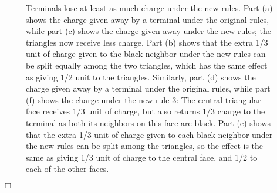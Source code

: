 \documentclass[11pt]{article}
\renewenvironment{proof}{\vspace{-0.1in}\noindent{\bf Proof:}}{\hspace*{\fill}$\Box$\par}
\begin{document}
\begin{proof}
\begin{figure}[h]
\begin{center}
    \end{center}
    \captionsetup{justification=centerfirst,font=small}
    \caption{Terminals lose at least as much charge under the new
      rules. \newline
      Part (a) shows the charge given away by a
      terminal under the original rules, while part (c) shows the
      charge given away under the new rules; the triangles now receive
      less charge.  Part (b) shows that the extra 1/3 unit of charge
      given to the black neighbor under the new rules can be split
      equally among the two triangles, which has the same effect as
      giving 1/2 unit to the triangles.
      Similarly, part (d) shows the charge given away by a terminal
      under the original rules, while part (f) shows the charge under
      the new rule 3: The central triangular face receives 1/3 unit of
      charge, but also returns 1/3 charge to the terminal as both its
      neighbors on this face are black. Part (e) shows that the extra
      1/3 unit of charge given to each black neighbor under the new
      rules can be split among the triangles, so the effect is the
      same as giving 1/3 unit of charge to the central face, and 1/2
      to each of the other faces.
    } \label{fig:discharging}
  \end{figure}



\end{proof}
\end{document}
